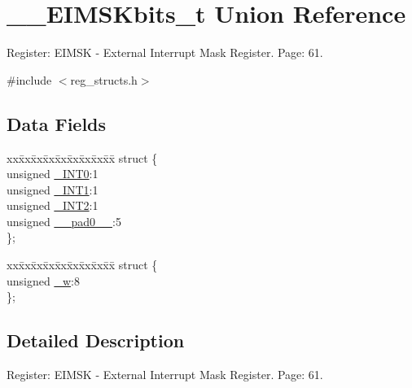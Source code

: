 \hypertarget{union_____e_i_m_s_kbits__t}{\section{\+\_\+\+\_\+\+E\+I\+M\+S\+Kbits\+\_\+t Union Reference}
\label{union_____e_i_m_s_kbits__t}
}


Register\+: E\+I\+M\+S\+K -\/ External Interrupt Mask Register. Page\+: 61.  




{\ttfamily \#include $<$reg\+\_\+structs.\+h$>$}

\subsection*{Data Fields}
\begin{DoxyCompactItemize}
\item 
\begin{tabbing}
xx\=xx\=xx\=xx\=xx\=xx\=xx\=xx\=xx\=\kill
struct \{\\
\>unsigned \hyperlink{union_____e_i_m_s_kbits__t_a5542937570bc5a41fcdc76222207b6e8}{\_INT0}:1\\
\>unsigned \hyperlink{union_____e_i_m_s_kbits__t_a7d56dd76bfbe8b45720080be775ed7d2}{\_INT1}:1\\
\>unsigned \hyperlink{union_____e_i_m_s_kbits__t_a7eefb1923e830c81be8bd25862d5e3e8}{\_INT2}:1\\
\>unsigned \hyperlink{union_____e_i_m_s_kbits__t_a2cd268092abd4e5492b53adf574f6207}{\_\_pad0\_\_}:5\\
\}; \\

\end{tabbing}\item 
\begin{tabbing}
xx\=xx\=xx\=xx\=xx\=xx\=xx\=xx\=xx\=\kill
struct \{\\
\>unsigned \hyperlink{union_____e_i_m_s_kbits__t_ac46f91ef3ab7606b6009bf3f2f54d325}{\_w}:8\\
\}; \\

\end{tabbing}\end{DoxyCompactItemize}


\subsection{Detailed Description}
Register\+: E\+I\+M\+S\+K -\/ External Interrupt Mask Register. Page\+: 61. 

